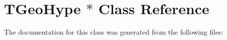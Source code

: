 \hypertarget{class_t_geo_hype_01_5}{
\section{TGeoHype $\ast$ Class Reference}
\label{class_t_geo_hype_01_5}
}


The documentation for this class was generated from the following files: